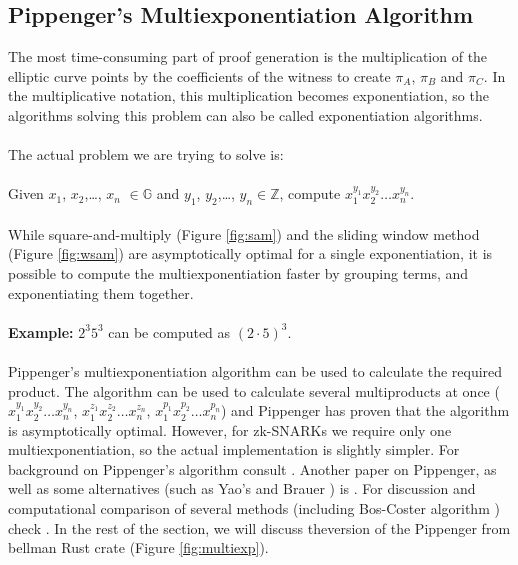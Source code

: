 \subsection{Pippenger's Multiexponentiation Algorithm}
The most time-consuming part of proof generation is the multiplication of the elliptic curve points by the coefficients of the witness to create $\pi_A$, $\pi_B$ and $\pi_C$. In the multiplicative notation, this multiplication becomes exponentiation, so the algorithms solving this problem can also be called exponentiation algorithms.\\
\\
The actual problem we are trying to solve is:\\
\\
Given $x_1$, $x_2$,\dots, $x_n$ $\in \mathbb{G}$ and $y_1$, $y_2$,\dots, $y_n \in \mathbb{Z}$, compute $x_1^{y_1} x_2^{y_2} \dots x_n^{y_n}$.\\
\\
While square-and-multiply (Figure \ref{fig:sam}) and the sliding window method (Figure \ref{fig:wsam}) are asymptotically optimal for a single exponentiation, it is possible to compute the multiexponentiation faster by grouping terms, and exponentiating them together.\\
\\
\textbf{Example:} $2^3 5^3$ can be computed as $(2 \cdot 5)^3$.\\
\\
Pippenger's multiexponentiation algorithm \cite{pippenger1976evaluation} can be used to calculate the required product. The algorithm can be used to calculate several multiproducts at once ($x_1^{y_1} x_2^{y_2} \dots x_n^{y_n}$, $x_1^{z_1} x_2^{z_2} \dots x_n^{z_n}$, $x_1^{p_1} x_2^{p_2} \dots x_n^{p_n}$) and Pippenger has proven that the algorithm is asymptotically optimal. However, for zk-SNARKs we require only one multiexponentiation, so the actual implementation is slightly simpler. For background on Pippenger's algorithm consult \cite{henry2010pippenger}. Another paper on Pippenger, as well as some alternatives (such as Yao's \cite{yao1976evaluation} and Brauer \cite{brauer1939addition}) is \cite{bernstein2002pippenger3s}. For discussion and computational comparison of several methods (including Bos-Coster algorithm \cite{bos1989addition}) check \cite{bergeron1994efficient}. In the rest of the section, we will discuss theversion of the Pippenger from bellman Rust crate (Figure \ref{fig:multiexp}).
